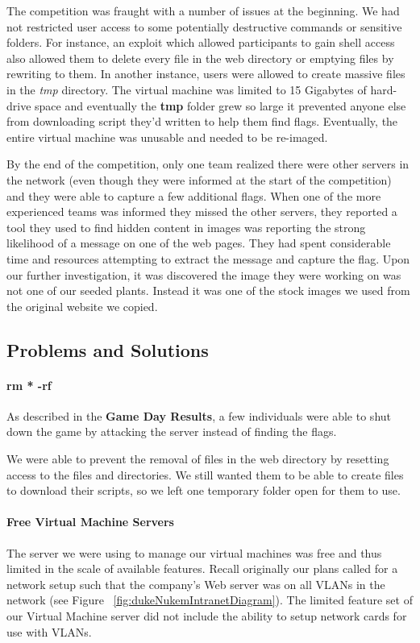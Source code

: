 \documentclass[10pt]{article}
\begin{document}
The competition was fraught with a number of issues at the beginning. We had not
restricted user access to some potentially destructive commands or sensitive
folders. For instance, an exploit which allowed participants to gain shell
access also allowed them to delete every file in the web directory or emptying
files by rewriting to them. In another instance, users were allowed to create
massive files in the \textit{tmp} directory. The virtual machine was limited to
15 Gigabytes of hard-drive space and eventually the \textbf{tmp} folder grew so
large it prevented anyone else from downloading script they'd written to help
them find flags. Eventually, the entire virtual machine was unusable and needed
to be re-imaged.

By the end of the competition, only one team realized there were other servers
in the network (even though they were informed at the start of the competition)
and they were able to capture a few additional flags. When one of the more
experienced teams was informed they missed the other servers, they reported a
tool they used to find hidden content in images was reporting the strong
likelihood of a message on one of the web pages. They had spent considerable
time and resources attempting to extract the message and capture the flag. Upon
our further investigation, it was discovered the image they were working on was
not one of our seeded plants. Instead it was one of the stock images we used
from the original website we copied.

\subsection{Problems and Solutions}
\paragraph*{rm * -rf} As described in the \textbf{Game Day Results},
a few individuals were able to shut down the game by attacking the server
instead of finding the flags.

We were able to prevent the removal of files in the web directory by resetting
access to the files and directories. We still wanted them to be able to create
files to download their scripts, so we left one temporary folder open for them to
use. 

\paragraph*{Free Virtual Machine Servers} The server we were using to manage our
virtual machines was free and thus limited in the scale of available features.
Recall originally our plans called for a network setup such that the company's
Web server was on all VLANs in the network (see Figure
~\ref{fig:dukeNukemIntranetDiagram}). The limited feature set of our Virtual
Machine server did not include the ability to setup network cards for use with
VLANs. 
\end{document}
